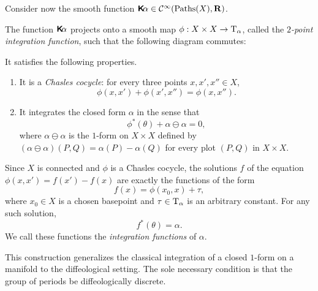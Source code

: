 \documentclass[10pt,reqno,letterpaper,twoside]{amsbook}
\begin{document}
\begin{article}
    Consider now the smooth function $\boldsymbol{\mathsf{K}}\!\alpha \in {\mathcal{C}}^\infty(\operatorname{Paths}(X),{\mathbf{R}})$.
    
    \begin{proposition}[2]
      The function $\boldsymbol{\mathsf{K}}\!\alpha$ projects onto a smooth map
      $\phi: X \times X \to \mathrm{T}_\alpha$,
      called the \emph{$2$-point integration function},
      such that the following diagram commutes:
      \begin{center}
      \end{center}
      It satisfies the following properties.
      \begin{enumerate}
        \item It is a \emph{Chasles cocycle}:
        for every three points $x,x',x'' \in X$,
        \[
          \phi(x,x') + \phi(x',x'') = \phi(x,x'').
          \]%
        \item It integrates the closed form $\alpha$ in the sense that
        \[
          \phi^*(\theta) + \alpha \ominus \alpha = 0,
          \]%
        where $\alpha \ominus \alpha$ is the $1$-form on $X \times X$ defined by
        $(\alpha \ominus \alpha)(P,Q) = \alpha(P) - \alpha(Q)$
        for every plot $(P,Q)$ in $X \times X$.
      \end{enumerate}
    \end{proposition}
    
    Since $X$ is connected and $\phi$ is a Chasles cocycle,
    the solutions $f$ of the equation $\phi(x,x') = f(x') - f(x)$
    are exactly the functions of the form
    \[
      f(x) = \phi(x_0,x) + \tau,
      \]%
    where $x_0 \in X$ is a chosen basepoint and $\tau \in \mathrm{T}_\alpha$ is an
    arbitrary constant.
    For any such solution,
    \[
      f^*(\theta) = \alpha.
      \]%
    We call these functions the \emph{integration functions} of $\alpha$.
    
    This construction generalizes the classical integration of a closed $1$-form
    on a manifold to the diffeological setting.
    The sole necessary condition is that the group of periods be
    diffeologically discrete.
  \end{article}
  
\end{document}
